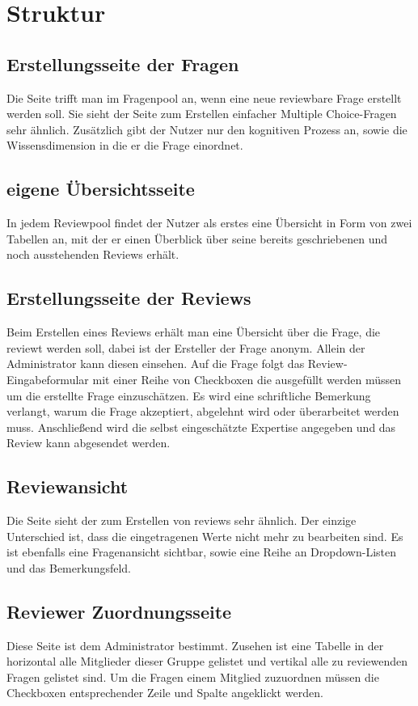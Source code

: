 \documentclass[12pt,a4paper]{scrreprt}
\begin{document}
\chapter{Struktur}
\section{Erstellungsseite der Fragen}
Die Seite trifft man im Fragenpool an, wenn eine neue reviewbare Frage erstellt werden soll. Sie sieht der Seite zum Erstellen einfacher Multiple Choice-Fragen sehr ähnlich. Zusätzlich gibt der Nutzer nur den kognitiven Prozess an, sowie die Wissensdimension in die er die Frage einordnet. 
\section{eigene \"Ubersichtsseite}
In jedem Reviewpool findet der Nutzer als erstes eine Übersicht in Form von zwei Tabellen an, mit der er einen Überblick über seine bereits geschriebenen und noch ausstehenden Reviews erhält. 	
\section{Erstellungsseite der Reviews}
Beim Erstellen eines Reviews erhält man eine Übersicht über die Frage, die reviewt werden soll, dabei ist der Ersteller der Frage anonym. Allein der Administrator kann diesen einsehen.
Auf die Frage folgt das Review-Eingabeformular mit einer Reihe von Checkboxen die ausgefüllt werden müssen um die erstellte Frage einzuschätzen. Es wird eine schriftliche Bemerkung verlangt, warum die Frage akzeptiert, abgelehnt wird oder überarbeitet werden muss.
Anschließend wird die selbst eingeschätzte Expertise angegeben und das Review kann abgesendet werden.

\section{Reviewansicht}
Die Seite sieht der zum Erstellen von reviews sehr ähnlich. Der einzige Unterschied ist, dass die eingetragenen Werte nicht mehr zu bearbeiten sind. Es ist ebenfalls eine Fragenansicht sichtbar, sowie  eine Reihe an Dropdown-Listen und das Bemerkungsfeld. 

\section{Reviewer Zuordnungsseite}
Diese Seite ist dem Administrator bestimmt. Zusehen ist eine Tabelle in der horizontal alle Mitglieder dieser Gruppe gelistet und vertikal alle zu reviewenden Fragen gelistet sind. Um die Fragen einem Mitglied zuzuordnen müssen die Checkboxen  entsprechender Zeile und Spalte angeklickt werden. 
\end{document}
